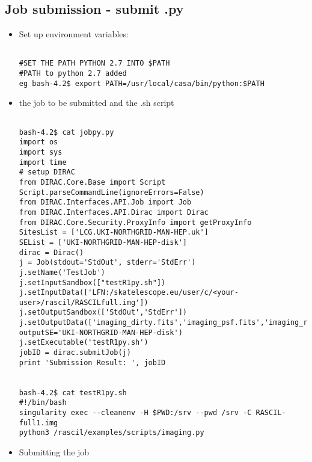 \documentclass[english]{article}
\begin{document}
\subsection{Job submission - submit .py}

\begin{itemize}
    \item Set up environment variables:
   \begin{verbatim}
   
#SET THE PATH PYTHON 2.7 INTO $PATH
#PATH to python 2.7 added
eg bash-4.2$ export PATH=/usr/local/casa/bin/python:$PATH

\end{verbatim}



\item the job to be submitted and the .sh script
  \begin{verbatim}

bash-4.2$ cat jobpy.py
import os
import sys
import time
# setup DIRAC
from DIRAC.Core.Base import Script
Script.parseCommandLine(ignoreErrors=False)
from DIRAC.Interfaces.API.Job import Job
from DIRAC.Interfaces.API.Dirac import Dirac
from DIRAC.Core.Security.ProxyInfo import getProxyInfo
SitesList = ['LCG.UKI-NORTHGRID-MAN-HEP.uk']
SEList = ['UKI-NORTHGRID-MAN-HEP-disk']
dirac = Dirac()
j = Job(stdout='StdOut', stderr='StdErr')
j.setName('TestJob')
j.setInputSandbox(["testR1py.sh"])
j.setInputData(['LFN:/skatelescope.eu/user/c/<your-user>/rascil/RASCILfull.img'])
j.setOutputSandbox(['StdOut','StdErr'])
j.setOutputData(['imaging_dirty.fits','imaging_psf.fits','imaging_restored.fits'],
outputSE='UKI-NORTHGRID-MAN-HEP-disk')
j.setExecutable('testR1py.sh')
jobID = dirac.submitJob(j)
print 'Submission Result: ', jobID


bash-4.2$ cat testR1py.sh
#!/bin/bash
singularity exec --cleanenv -H $PWD:/srv --pwd /srv -C RASCIL-full1.img
python3 /rascil/examples/scripts/imaging.py
\end{verbatim}

\item Submitting the job
  \begin{verbatim}


\end{verbatim}
\end{itemize}
\end{document}
